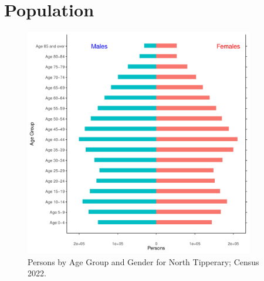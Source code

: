 \documentclass{article}
\begin{document}
\pagebreak

\section{Population} 
\label{sect:Pop}

\begin{figure}[h]
	\centering
	\includegraphics[width = 100mm]{../figures/PyramidPlot.pdf}
	\caption{Persons by Age Group and Gender for North Tipperary; Census 2022.}
	\label{fig:2ae19629-1a6a-13a3-e055-000000000001}
	\end{figure}
\end{document}
